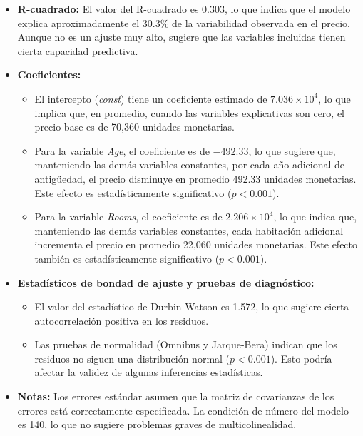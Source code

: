 \documentclass[a4paper,12pt]{article}
\begin{document}
\begin{itemize}
    \item \textbf{R-cuadrado:} El valor del R-cuadrado es 0.303, lo que indica que el modelo explica aproximadamente el 30.3\% de la variabilidad observada en el precio. Aunque no es un ajuste muy alto, sugiere que las variables incluidas tienen cierta capacidad predictiva.

    \item \textbf{Coeficientes:} 
    \begin{itemize}
        \item El intercepto (\textit{const}) tiene un coeficiente estimado de $7.036 \times 10^4$, lo que implica que, en promedio, cuando las variables explicativas son cero, el precio base es de 70,360 unidades monetarias.
        \item Para la variable \textit{Age}, el coeficiente es de $-492.33$, lo que sugiere que, manteniendo las demás variables constantes, por cada año adicional de antigüedad, el precio disminuye en promedio 492.33 unidades monetarias. Este efecto es estadísticamente significativo ($p < 0.001$).
        \item Para la variable \textit{Rooms}, el coeficiente es de $2.206 \times 10^4$, lo que indica que, manteniendo las demás variables constantes, cada habitación adicional incrementa el precio en promedio 22,060 unidades monetarias. Este efecto también es estadísticamente significativo ($p < 0.001$).
    \end{itemize}

    \item \textbf{Estadísticos de bondad de ajuste y pruebas de diagnóstico:}
    \begin{itemize}
        \item El valor del estadístico de Durbin-Watson es 1.572, lo que sugiere cierta autocorrelación positiva en los residuos.
        \item Las pruebas de normalidad (Omnibus y Jarque-Bera) indican que los residuos no siguen una distribución normal ($p < 0.001$). Esto podría afectar la validez de algunas inferencias estadísticas.
    \end{itemize}

    \item \textbf{Notas:} Los errores estándar asumen que la matriz de covarianzas de los errores está correctamente especificada. La condición de número del modelo es 140, lo que no sugiere problemas graves de multicolinealidad.
\end{itemize}
\end{document}
